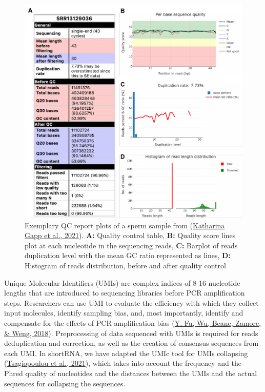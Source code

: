 \documentclass[12pt,twoside]{reedthesis}
\begin{document}
\begin{figure}[h]

{\centering \includegraphics{thesis_files/figure-latex/3f4-1} 

}

\caption{Exemplary QC report plots of a sperm sample from (\protect\hyperlink{ref-gapp2021}{Katharina Gapp et al., 2021}). \textbf{A:} Quality control table, \textbf{B:} Quality score lines plot at each nucleotide in the sequencing reads, \textbf{C:} Barplot of reads duplication level with the mean GC ratio represented as lines, \textbf{D:} Histogram of reads distribution, before and after quality control}\label{fig:3f4}
\end{figure}
Unique Molecular Identifiers (UMIs) are complex indices of 8-16
nucleotide lengths that are introduced to sequencing libraries before
PCR amplification steps. Researchers can use UMI to evaluate the
efficiency with which they collect input molecules, identify sampling
bias, and, most importantly, identify and compensate for the effects of
PCR amplification bias (\protect\hyperlink{ref-fu2018}{Y. Fu, Wu, Beane, Zamore, \& Weng, 2018}). Preprocessing of data sequenced with
UMIs is required for reads deduplication and correction, as well as the
creation of consensus sequences from each UMI. In shortRNA, we have
adapted the UMIc tool for UMIs collapsing (\protect\hyperlink{ref-tsagiopoulou2021}{Tsagiopoulou et al., 2021}), which
takes into account the frequency and the Phred quality of nucleotides
and the distances between the UMIs and the actual sequences for
collapsing the sequences.
\end{document}

